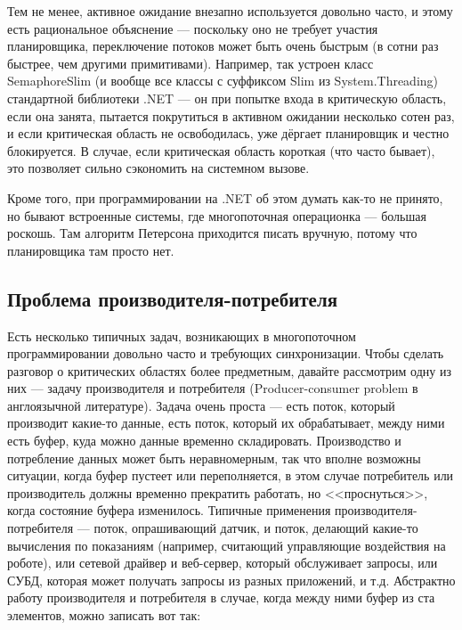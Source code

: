 \documentclass[a5paper]{article}
\begin{document}
Тем не менее, активное ожидание внезапно используется довольно часто, и этому есть рациональное объяснение --- поскольку оно не требует участия планировщика, переключение потоков может быть очень быстрым (в сотни раз быстрее, чем другими примитивами). Например, так устроен класс SemaphoreSlim (и вообще все классы с суффиксом Slim из System.Threading) стандартной библиотеки .NET --- он при попытке входа в критическую область, если она занята, пытается покрутиться в активном ожидании несколько сотен раз, и если критическая область не освободилась, уже дёргает планировщик и честно блокируется. В случае, если критическая область короткая (что часто бывает), это позволяет сильно сэкономить на системном вызове.

Кроме того, при программировании на .NET об этом думать как-то не принято, но бывают встроенные системы, где многопоточная операционка --- большая роскошь. Там алгоритм Петерсона приходится писать вручную, потому что планировщика там просто нет.

\subsection{Проблема производителя-потребителя}

Есть несколько типичных задач, возникающих в многопоточном программировании довольно часто и требующих синхронизации. Чтобы сделать разговор о критических областях более предметным, давайте рассмотрим одну из них --- задачу производителя и потребителя (Producer-consumer problem в англоязычной литературе). Задача очень проста --- есть поток, который производит какие-то данные, есть поток, который их обрабатывает, между ними есть буфер, куда можно данные временно складировать. Производство и потребление данных может быть неравномерным, так что вполне возможны ситуации, когда буфер пустеет или переполняется, в этом случае потребитель или производитель должны временно прекратить работать, но <<проснуться>>, когда состояние буфера изменилось. Типичные применения производителя-потребителя --- поток, опрашивающий датчик, и поток, делающий какие-то вычисления по показаниям (например, считающий управляющие воздействия на роботе), или сетевой драйвер и веб-сервер, который обслуживает запросы, или СУБД, которая может получать запросы из разных приложений, и т.д. Абстрактно работу производителя и потребителя в случае, когда между ними буфер из ста элементов, можно записать вот так:
\end{document}

